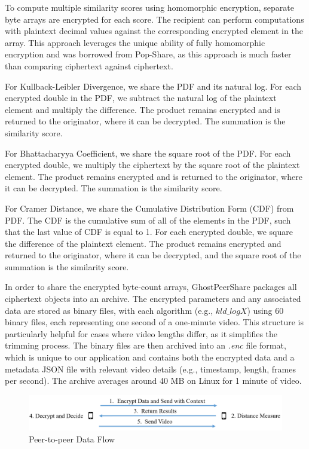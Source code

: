 To compute multiple similarity scores using homomorphic encryption, separate byte arrays are encrypted for each score. The recipient can perform computations with plaintext decimal values against the corresponding encrypted element in the array. This approach leverages the unique ability of fully homomorphic encryption and was borrowed from Pop-Share, as this approach is much faster than comparing ciphertext against ciphertext. 

For Kullback-Leibler Divergence, we share the PDF and its natural log. For each encrypted double in the PDF, we subtract the natural log of the plaintext element and multiply the difference. The product remains encrypted and is returned to the originator, where it can be decrypted. The summation is the similarity score.

For Bhattacharyya Coefficient, we share the square root of the PDF. For each encrypted double, we multiply the ciphertext by the square root of the plaintext element. The product remains encrypted and is returned to the originator, where it can be decrypted. The summation is the similarity score.

For Cramer Distance, we share the Cumulative Distribution Form (CDF) from PDF. The CDF is the cumulative sum of all of the elements in the PDF, such that the last value of CDF is equal to 1. For each encrypted double, we square the difference of the plaintext element. The product remains encrypted and returned to the originator, where it can be decrypted, and the square root of the summation is the similarity score.

In order to share the encrypted byte-count arrays, GhostPeerShare packages all ciphertext objects into an archive. The encrypted parameters and any associated data are stored as binary files, with each algorithm (e.g., $kld\_logX$) using 60 binary files, each representing one second of a one-minute video. This structure is particularly helpful for cases where video lengths differ, as it simplifies the trimming process. The binary files are then archived into an \textit{.enc} file format, which is unique to our application and contains both the encrypted data and a metadata JSON file with relevant video details (e.g., timestamp, length, frames per second). The archive averages around 40 MB on Linux for 1 minute of video.

\begin{figure}[t]
    \centering
    \includegraphics[width=\textwidth]{4 Design/4.3 Peer-to-Peer.png}
    \caption{Peer-to-peer Data Flow}
    \label{fig:peer-to-peer-data-flow}
\end{figure}

